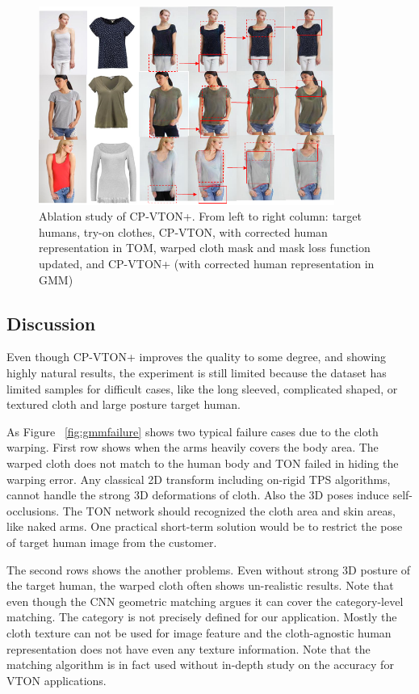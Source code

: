 \begin{figure}
\centering
\includegraphics[height=6.5cm, scale=1]{figures/ablation.png} 
\caption{Ablation study of CP-VTON+. From left to right column: target humans, try-on clothes, CP-VTON, with corrected human representation in TOM, warped cloth mask and mask loss function updated, and CP-VTON+ (with corrected human representation in GMM)
}
\label{fig:ablation}
\end{figure}


\subsection{Discussion}

Even though CP-VTON+ improves the quality to some degree, and showing highly natural results, the experiment is still limited because the dataset has limited samples for difficult cases, like the long sleeved, complicated shaped, or textured cloth and large posture target human. 

As Figure ~\ref{fig:gmmfailure} shows two typical failure cases due to the cloth warping. First row shows when the arms heavily covers the body area. The warped cloth does not match to the human body and TON failed in hiding the warping error. 
Any classical 2D transform including on-rigid TPS algorithms, cannot handle the strong 3D deformations of cloth.  Also the 3D poses induce self-occlusions. The TON network should recognized the cloth area and skin areas, like naked arms. One practical short-term solution would be to restrict the pose of target human image from the customer. 

The second rows shows the another problems. Even without strong 3D posture of the target human, the warped cloth often shows un-realistic results. Note that even though the CNN geometric matching argues it can cover the category-level matching. The category is not precisely defined for our application. Mostly the cloth texture can not be used for image feature and the cloth-agnostic human representation does not have even any texture information. Note that the matching algorithm is in fact used without in-depth study on the accuracy for VTON applications. 

